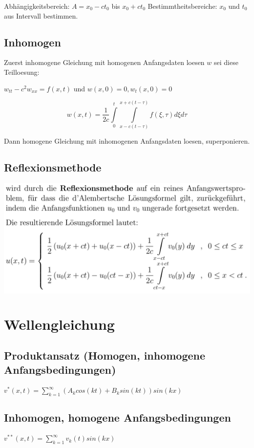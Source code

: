 \documentclass[10pt,a4paper]{article}
\begin{document}
Abhängigkeitsbereich: $A = x_0 - c t_0 $ bis $ x_0 + c t_0$ Bestimmtheitsbereiche: $x_0$ und $t_0$ aus Intervall bestimmen.
\subsection{Inhomogen}
Zuerst inhomogene Gleichung mit homogenen Anfangsdaten loesen $w$ sei diese Teilloesung:

$w_{tt} - c^2 w_{xx} = f(x,t)$ und $w(x,0)=0, w_t(x,0)=0$

\[w(x,t) = \frac{1}{2c} \int\limits_0^t \int\limits_{x-c(t-\tau)}^{x+c(t-\tau)} f(\xi, \tau) d\xi d\tau\]

Dann homogene Gleichung mit inhomogenen Anfangsdaten loesen, superponieren.

\subsection{Reflexionsmethode}
\includegraphics[scale=0.3]{reflexion}

\section{Wellengleichung}
\subsection{Produktansatz (Homogen, inhomogene Anfangsbedingungen)}
$v^*(x,t) = \sum\limits_{k=1}^\infty \left( A_k cos(k t) + B_k sin( k t) \right) sin(k x)$
\subsection{Inhomogen, homogene Anfangsbedingungen}
$v^{**}(x,t) = \sum\limits_{k=1}^\infty v_k(t) sin(k x)$
\end{document}
